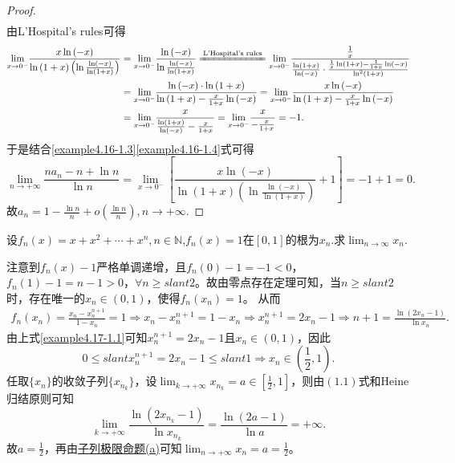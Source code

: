 \documentclass[../../main.tex]{subfiles}
\begin{document}
\begin{proof}
\begin{align}
\label{example4.16-1.3}
\end{align}
由L'Hospital's rules可得
\begin{align}
\underset{x\rightarrow 0^-}{\lim}\frac{x\ln \left( -x \right)}{\ln \left( 1+x \right) \left( \ln \frac{\ln \left( -x \right)}{\ln \left( 1+x \right)} \right)}&=\underset{x\rightarrow 0^-}{\lim}\frac{\ln \left( -x \right)}{\ln \frac{\ln \left( -x \right)}{\ln \left( 1+x \right)}}\xlongequal{\text{L'Hospital's rules}}\underset{x\rightarrow 0^-}{\lim}\frac{\frac{1}{x}}{\frac{\ln \left( 1+x \right)}{\ln \left( -x \right)}\cdot \frac{\frac{1}{x}\ln \left( 1+x \right) -\frac{1}{1+x}\ln \left( -x \right)}{\ln ^2\left( 1+x \right)}}\nonumber
\\
&=\underset{x\rightarrow 0^-}{\lim}\frac{\ln \left( -x \right) \cdot \ln \left( 1+x \right)}{\ln \left( 1+x \right) -\frac{x}{1+x}\ln \left( -x \right)}=\underset{x\rightarrow 0^-}{\lim}\frac{x\ln \left( -x \right)}{\ln \left( 1+x \right) -\frac{x}{1+x}\ln \left( -x \right)}\nonumber
\\
&=\underset{x\rightarrow 0^-}{\lim}\frac{x}{\frac{\ln \left( 1+x \right)}{\ln \left( -x \right)}-\frac{x}{1+x}}=\underset{x\rightarrow 0^-}{\lim}\frac{x}{-\frac{x}{1+x}}=-1.
\label{example4.16-1.4}
\end{align}
于是结合\eqref{example4.16-1.3}\eqref{example4.16-1.4}式可得
\[
\lim_{n\rightarrow +\infty}\frac{na_n - n + \ln n}{\ln n} = \lim_{x\rightarrow 0^-}\left[ \frac{x\ln(-x)}{\ln(1 + x)\left(\ln \frac{\ln(-x)}{\ln(1 + x)}\right)} + 1 \right] = -1 + 1 = 0.
\]
故\(a_n = 1 - \frac{\ln n}{n} + o\left(\frac{\ln n}{n}\right), n \rightarrow +\infty\).
\end{proof}

\begin{example}
设\(f_n(x)=x + x^2+\cdots+x^n,n\in\mathbb{N}\),\(f_n(x)=1\)在\([0,1]\)的根为\(x_n\).求\(\lim_{n\rightarrow\infty}x_n\).
\end{example}
\begin{solution}
注意到\(f_n(x) - 1\)严格单调递增，且\(f_n(0) - 1 = -1 < 0\)，\(f_n(1) - 1 = n - 1 > 0\)，\(\forall n\geqslant slant 2\)。故由零点存在定理可知，当\(n\geqslant slant 2\)时，存在唯一的\(x_n\in(0, 1)\)，使得\(f_n(x_n) = 1\)。
从而
\begin{align}\label{example4.17-1.1}
f_n(x_n)=\frac{x_n - x_{n}^{n + 1}}{1 - x_n}=1\Rightarrow x_n - x_{n}^{n + 1}=1 - x_n\Rightarrow x_{n}^{n + 1}=2x_n - 1\Rightarrow n + 1=\frac{\ln(2x_n - 1)}{\ln x_n}.  
\end{align}
由上式\eqref{example4.17-1.1}可知\(x_{n}^{n + 1}=2x_n - 1\)且\(x_n\in(0, 1)\)，因此
\[
0\leqslant slant x_{n}^{n + 1}=2x_n - 1\leqslant slant 1\Rightarrow x_n\in\left(\frac{1}{2}, 1\right).
\]
任取\(\{x_n\}\)的收敛子列\(\{x_{n_k}\}\)，设\(\lim_{k\rightarrow +\infty}x_{n_k}=a\in\left[\frac{1}{2}, 1\right]\)，则由\((1.1)\)式和Heine归结原则可知
\[
\lim_{k\rightarrow +\infty}\frac{\ln(2x_{n_k} - 1)}{\ln x_{n_k}}=\frac{\ln(2a - 1)}{\ln a}=+\infty.
\]
故\(a = \frac{1}{2}\)，再由\hyperref[proposition:子列极限命题]{子列极限命题(a)}可知\(\lim_{n\rightarrow +\infty}x_n=a=\frac{1}{2}\)。
\end{solution}
\end{document}
